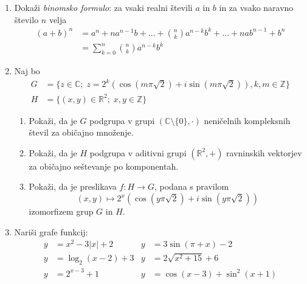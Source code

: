 \documentclass[a4paper,12pt]{article}
\begin{document}
\begin{enumerate}
\item
Dokaži \emph{binomsko formulo}: za vsaki realni števili $a$ in $b$ in za vsako naravno število $n$ velja
\begin{align*}
   (a+b)^n &= a^n + n a^{n-1} b + \dots + \binom{n}{k} a^{n-k} b^k + \dots + n a b^{n-1} + b^n \\
   &= \sum_{k=0}^n \binom{n}{k} a^{n-k} b^k
\end{align*}

\item
Naj bo
\begin{align*}
   G &= \{z\in\mathbb{C};\; z=2^k(\cos(m\pi\sqrt{2})+i\sin(m\pi\sqrt{2})), k,m\in\mathbb{Z}\} \\
   H &= \{(x,y)\in\mathbb{R}^2;\; x,y\in\mathbb{Z}\}
\end{align*}
\begin{enumerate}
   \item
      Pokaži, da je $G$ podgrupa v grupi $(\mathbb{C}\setminus\{0\},\cdot)$
      neničelnih kompleksnih števil za običajno množenje.
   \item
      Pokaži, da je $H$ podgrupa v aditivni grupi $(\mathbb{R}^2,+)$
      ravninskih vektorjev za običajno seštevanje po komponentah.
   \item
      Pokaži, da je preslikava $f:H\to G$, podana s pravilom
      $$ (x,y) \mapsto 2^x(\cos(y\pi\sqrt{2})+i\sin(y\pi\sqrt{2})) $$
      izomorfizem grup $G$ in $H$.
\end{enumerate}

\item
Nariši grafe funkcij:
\begin{align*}
   y &= x^2 - 3|x| + 2   & y &= 3 \sin(\pi+x) - 2 \\
   y &= \log_2(x-2) + 3  & y &= 2 \sqrt{x^2+15} + 6 \\
   y &= 2^{x-3} + 1      & y &= \cos(x-3) + \sin^2(x+1) \\
\end{align*}

\end{enumerate}
\end{document}
